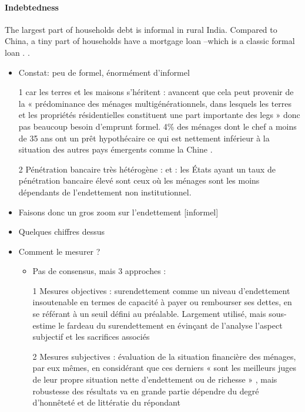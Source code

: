 \documentclass[a4paper, 11pt, onecolumn]{article}
\begin{document}
\paragraph{Indebtedness}
The largest part of households debt is informal in rural India.
Compared to China, a tiny part of households have a mortgage loan --which is a classic formal loan \citep{Badarinza2016b}.
.

\cite{Badarinza2016b} 

\begin{itemize}
\item Constat: peu de formel, énormément d'informel
\item[1] car les terres et les maisons s'héritent : \citep{Badarinza2016b} avancent que cela peut provenir de la « prédominance des ménages multigénérationnels, dans lesquels les terres et les propriétés résidentielles constituent une part importante des legs » donc pas beaucoup besoin d'emprunt formel. 4\% des ménages dont le chef a moins de 35 ans ont un prêt hypothécaire ce qui est nettement inférieur à la situation des autres pays émergents comme la Chine \citep{Badarinza2016b}.
\item[2] Pénétration bancaire très hétérogène : \citep{Badarinza2016b} et \citep{Burgess2005} : les États ayant un taux de pénétration bancaire élevé sont ceux où les ménages sont les moins dépendants de l’endettement non institutionnel.
\item Faisons donc un gros zoom sur l'endettement [informel]
\item Quelques chiffres dessus
\item Comment le mesurer ? 
	\begin{itemize}
	\item Pas de consensus, mais 3 approches \citep{Betti2007} \citep{Ferreira2000} :
	\item[1] Mesures objectives : surendettement comme un niveau d’endettement insoutenable en termes de capacité à payer ou rembourser ses dettes, en se référant à un seuil défini au préalable. Largement utilisé, mais sous-estime le fardeau du surendettement en évinçant de l’analyse l’aspect subjectif et les sacrifices associés \citep{Betti2007}
	\item[2] Mesures subjectives : évaluation de la situation financière des ménages, par eux mêmes, en considérant que ces derniers « sont les meilleurs juges de leur propre situation nette d’endettement ou de richesse » \citep{Betti2007}, mais robustesse des résultats va en grande partie dépendre du degré d’honnêteté et de littératie du répondant \citep{Betti2007} \citep{DAlessio2013} \citep{Schicks2011}

\end{itemize}
\end{itemize}
\end{document}
